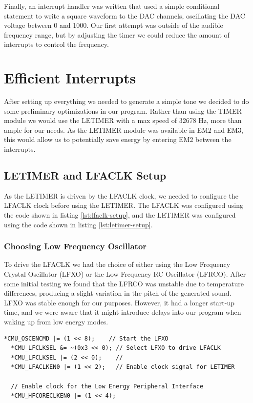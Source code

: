 Finally, an interrupt handler was written that used a simple conditional statement to write a square waveform to the DAC channels, oscillating the DAC voltage between 0 and 1000. Our first attempt was outside of the audible frequency range, but by adjusting the timer we could reduce the amount of interrupts to control the frequency.


\section{Efficient Interrupts}
After setting up everything we needed to generate a simple tone we decided to do some preliminary optimizations in our program. Rather than using the TIMER module we would use the LETIMER with a max speed of 32678 Hz, more than ample for our needs. As the LETIMER module was available in EM2 and EM3, this would allow us to potentially save energy by entering EM2 between the interrupts. \\


\subsection{LETIMER and LFACLK Setup}
As the LETIMER is driven by the LFACLK clock, we needed to configure the LFACLK clock before using the LETIMER. The LFACLK was configured using the code shown in listing \ref{lst:lfaclk-setup}, and the LETIMER was configured using the code shown in listing \ref{lst:letimer-setup}. 

\subsubsection{Choosing Low Frequency Oscillator}
To drive the LFACLK we had the choice of either using the Low Frequency Crystal Oscillator (LFXO) or the Low Frequency RC Oscillator (LFRCO). After some initial testing we found that the LFRCO was unstable due to temperature differences, producing a slight variation in the pitch of the generated sound. LFXO was stable enough for our purposes. However, it had a longer start-up time, and we were aware that it might introduce delays into our program when waking up from low energy modes. \cite{efm32-oscillator-design-considerations-application-note} \\
 
\noindent\begin{minipage}[c]{\textwidth}
  \begin{lstlisting}[caption=Setting up the LFACLK to drive the LETIMER ,label={lst:lfaclk-setup}]
  *CMU_OSCENCMD |= (1 << 8);    // Start the LFXO
  *CMU_LFCLKSEL &= ~(0x3 << 0); // Select LFXO to drive LFACLK
  *CMU_LFCLKSEL |= (2 << 0);    //
  *CMU_LFACLKEN0 |= (1 << 2);   // Enable clock signal for LETIMER 

  // Enable clock for the Low Energy Peripheral Interface
  *CMU_HFCORECLKEN0 |= (1 << 4);
  \end{lstlisting}
\end{minipage}

